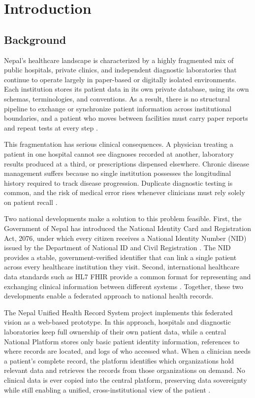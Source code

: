 \documentclass[12pt]{report}
\numberwithin{equation}{chapter}
\begin{document}
\chapter{Introduction}
\setcounter{page}{1}

\section{Background}
Nepal's healthcare landscape is characterized by a highly fragmented mix of public hospitals, private clinics, and independent diagnostic laboratories that continue to operate largely in paper-based or digitally isolated environments. Each institution stores its patient data in its own private database, using its own schemas, terminologies, and conventions. As a result, there is no structural pipeline to exchange or synchronize patient information across institutional boundaries, and a patient who moves between facilities must carry paper reports and repeat tests at every step \cite{who,mohp}.

This fragmentation has serious clinical consequences. A physician treating a patient in one hospital cannot see diagnoses recorded at another, laboratory results produced at a third, or prescriptions dispensed elsewhere. Chronic disease management suffers because no single institution possesses the longitudinal history required to track disease progression. Duplicate diagnostic testing is common, and the risk of medical error rises whenever clinicians must rely solely on patient recall \cite{bates1,bates2}.

Two national developments make a solution to this problem feasible. First, the Government of Nepal has introduced the National Identity Card and Registration Act, 2076, under which every citizen receives a National Identity Number (NID) issued by the Department of National ID and Civil Registration \cite{nidact}. The NID provides a stable, government-verified identifier that can link a single patient across every healthcare institution they visit. Second, international healthcare data standards such as HL7 FHIR provide a common format for representing and exchanging clinical information between different systems \cite{hl7spec,bender}. Together, these two developments enable a federated approach to national health records.

The Nepal Unified Health Record System project implements this federated vision as a web-based prototype. In this approach, hospitals and diagnostic laboratories keep full ownership of their own patient data, while a central National Platform stores only basic patient identity information, references to where records are located, and logs of who accessed what. When a clinician needs a patient's complete record, the platform identifies which organizations hold relevant data and retrieves the records from those organizations on demand. No clinical data is ever copied into the central platform, preserving data sovereignty while still enabling a unified, cross-institutional view of the patient \cite{dixon}.
\end{document}
